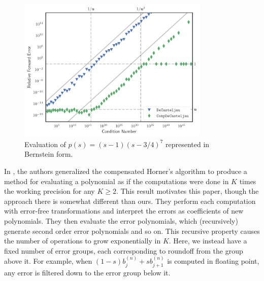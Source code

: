 \documentclass[letterpaper,10pt]{article}
\theoremstyle{definition}
\begin{document}
\begin{figure}
  \includegraphics[width=0.8125\textwidth]{../images/jlcs10_plot.pdf}
  \centering
  \captionsetup{width=.75\linewidth}
  \caption{Evaluation of \(p(s) = (s - 1)\left(s - 3/4\right)^7\)
    represented in Bernstein form.}
  \label{fig:jlcs-10}
\end{figure}

In \cite{Graillat2009}, the authors generalized the compensated Horner's
algorithm to produce a method for evaluating a polynomial as if
the computations were done in \(K\) times the working precision for
any \(K \geq 2\). This result motivates this paper, though the
approach there is somewhat different than ours. They perform each computation
with error-free transformations and interpret the errors as coefficients of new
polynomials. They then evaluate the error polynomials, which (recursively)
generate second order error polynomials and so on. This recursive property
causes the number of operations to grow exponentially in \(K\). Here, we
instead have a fixed number of error groups, each corresponding to roundoff
from the group above it. For example, when
\((1 - s) b_j^{(n)} + s b_{j + 1}^{(n)}\) is computed in floating point, any
error is filtered down to the error group below it.
\end{document}
